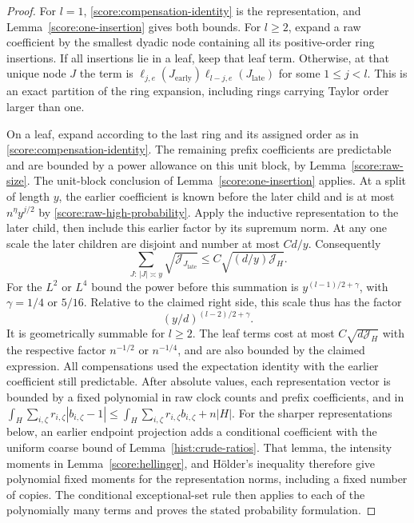 \begin{proof}
For $l=1$, \eqref{score:compensation-identity} is the representation, and
Lemma~\ref{score:one-insertion} gives both bounds.  For $l\ge2$, expand a raw
coefficient by the smallest dyadic node containing all its positive-order
ring insertions.  If all insertions lie in a leaf, keep that leaf term.
Otherwise, at that unique node $J$ the term is
$\ell_{j,e}(J_{\mathrm{early}})\ell_{l-j,e}(J_{\mathrm{late}})$ for some
$1\le j<l$.  This is an exact partition of the ring expansion, including
rings carrying Taylor order
larger than one.

On a leaf, expand according to the last ring and its assigned order as in
\eqref{score:compensation-identity}.  The remaining prefix coefficients
are predictable and are bounded by a power allowance on this unit block,
by Lemma~\ref{score:raw-size}.  The unit-block conclusion of
Lemma~\ref{score:one-insertion} applies.  At a split of length $y$, the earlier
coefficient is known before the later child and is at most
$n^\eta y^{j/2}$ by \eqref{score:raw-high-probability}.  Apply the inductive
representation to the later child, then include this earlier factor by its
supremum norm.  At any one scale the later children are disjoint and number
at most $Cd/y$.  Consequently
\[
 \sum_{J:\,|J|\asymp y}\sqrt{\mathcal J_{J_{\mathrm{late}}}}
      \le C\sqrt{(d/y)\mathcal J_H}.
\]
For the $L^2$ or $L^4$ bound the power before this summation is
$y^{(l-1)/2+\gamma}$, with $\gamma=1/4$ or $5/16$.  Relative to the claimed
right side, this scale thus has the factor
\[
 (y/d)^{(l-2)/2+\gamma}.
\]
It is geometrically summable for $l\ge2$.  The leaf terms cost at most
$C\sqrt{d\mathcal J_H}$ with the respective factor $n^{-1/2}$ or
$n^{-1/4}$, and are also bounded by the claimed expression.  All
compensations used the expectation identity with the earlier coefficient
still predictable.  After absolute values, each representation vector is
bounded by a fixed polynomial in raw clock counts and prefix coefficients,
and in
$\int_H\sum_{i,\zeta}r_{i,\zeta}|b_{i,\zeta}-1|
 \le\int_H\sum_{i,\zeta}r_{i,\zeta}b_{i,\zeta}+n|H|$.
For the sharper representations below, an earlier endpoint projection adds
a conditional coefficient with the uniform coarse bound of
Lemma~\ref{hist:crude-ratios}.  That lemma, the intensity moments in
Lemma~\ref{score:hellinger}, and H\"older's inequality therefore give
polynomial fixed moments for the representation norms, including a fixed
number of copies.  The conditional exceptional-set rule then applies to
each of the polynomially many terms and proves the stated probability
formulation.
\end{proof}

